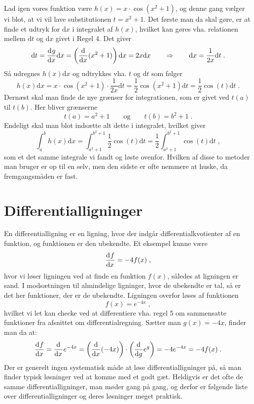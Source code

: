 \noindent
Lad igen vores funktion være $h(x) = x \cdot \cos(x^2+1)$, og denne gang vælger vi blot, at vi vil lave substitutionen $t = x^2 + 1$. Det første man da skal gøre, er at finde et udtryk for $\text{d}x$ i integralet af $h(x)$, hvilket kan gøres vha. relationen mellem  $\text{d}t$ og $\text{d}x$ givet i Regel 4. Det giver
\begin{equation*}
\text{d}t = \dif{x}{g} \text{d}x = \left( \dif{x}{} (x^2+1) \right) \text{d}x = 2x \text{d}x \qquad \Rightarrow \qquad \text{d}x = \frac{1}{2x} \text{d}t \; .
\end{equation*}
Så udregnes $h(x) \text{d}x$ og udtrykkes vha. $t$ og $\text{d}t$ som følger
\begin{equation*}
h(x) \text{d}x = x \cdot \cos(x^2+1) \cdot \frac{1}{2x} \text{d}t = \frac{1}{2} \cos(x^2+1) \text{d}t = \frac{1}{2} \cos(t) \text{d}t \; .
\end{equation*}
Dernæst skal man finde de nye grænser for integrationen, som er givet ved $t(a)$ til $t(b)$. Her bliver grænserne
\begin{equation*}
t(a) = a^2+1 \qquad \text{og} \qquad t(b) = b^2+1 \; .
\end{equation*}
Endeligt skal man blot indsætte alt dette i integralet, hvilket giver
\begin{equation*}
\int_a^b h(x) \text{d}x = \int_{a^2+1}^{b^2+1} \frac{1}{2} \cos(t) \text{d}t = \frac{1}{2} \int_{a^2+1}^{b^2+1}  \cos(t) \text{d}t \; ,
\end{equation*}
som et det samme integrale vi fandt og løste ovenfor. Hvilken af disse to metoder man bruger er op til en selv, men den sidste er ofte nemmere at huske, da fremgangsmåden er fast.

\section{Differentialligninger} \label{sec:difflign}
En differentialligning er en ligning, hvor der indgår
differentialkvotienter af en funktion, og funktionen er den
ubekendte. Et eksempel kunne være
\[
\dif{x}{f} = -4 f(x) \; ,
\]
hvor vi løser ligningen ved at finde en funktion $f(x)$, således at
ligningen er sand. I modsætningen til almindelige ligninger, hvor de
ubekendte er tal, så er det her funktioner, der er de
ubekendte. Ligningen overfor løses af funktionen
\[
f(x) = e^{-4x} \; ,
\]
hvilket vi let kan checke ved at differentiere vha. regel 5 om sammensatte funktioner fra afsnittet om differentialregning. Sætter man $g(x) = -4x$, finder man da at:
\[
\dif{x}{f} = \dif{x}{} e^{-4x}
= \left( \dif{x}{} (-4x) \right)  \cdot \left( \dif{g}{} e^{g} \right)
= -4 e^{-4x} = -4 f(x) \; .
\]
Der er generelt ingen systematisk måde at løse differentialligninger
på, så man finder typisk løsninger ved at komme med et godt
gæt. Heldigvis er det ofte de samme differentialligninger, man møder
gang på gang, og derfor er følgende liste over differentialligninger
og deres løsninger meget praktisk.

